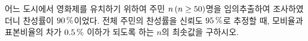 어느 도시에서 영화제를 유치하기 위하여 주민 $n\mkern3mu (n\ge 50)$명을 임의추출하여 조사하였더니 찬성률이 $90\mkern3mu \%$이었다. 전체 주민의 찬성률을 신뢰도 $95\mkern3mu \%$로 추정할 때, 모비율과 표본비율의 차가 $0.5\mkern3mu \%$ 이하가 되도록 하는 $n$의 최솟값을 구하시오. 
